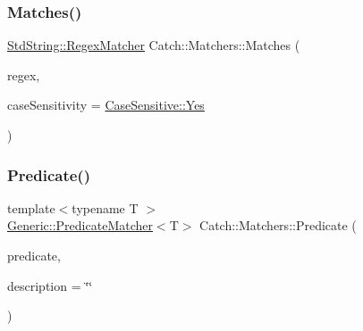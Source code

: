 \mbox{\label{namespace_catch_1_1_matchers_a82f1893cf50ae4c14b9b3e0980bf22b8}} 
\subsubsection{\texorpdfstring{Matches()}{Matches()}}
{\footnotesize\ttfamily \mbox{\hyperlink{struct_catch_1_1_matchers_1_1_std_string_1_1_regex_matcher}{Std\+String\+::\+Regex\+Matcher}} Catch\+::\+Matchers\+::\+Matches (\begin{DoxyParamCaption}\item[{std\+::string const \&}]{regex,  }\item[{\mbox{\hyperlink{struct_catch_1_1_case_sensitive_aad49d3aee2d97066642fffa919685c6a}{Case\+Sensitive\+::\+Choice}}}]{case\+Sensitivity = {\ttfamily \mbox{\hyperlink{struct_catch_1_1_case_sensitive_aad49d3aee2d97066642fffa919685c6aa7c5550b69ec3c502e6f609b67f9613c6}{Case\+Sensitive\+::\+Yes}}} }\end{DoxyParamCaption})}

\mbox{\label{namespace_catch_1_1_matchers_a034f2de6c0aac6f4a662fdf2558aedce}} 
\subsubsection{\texorpdfstring{Predicate()}{Predicate()}}
{\footnotesize\ttfamily template$<$typename T $>$ \\
\mbox{\hyperlink{class_catch_1_1_matchers_1_1_generic_1_1_predicate_matcher}{Generic\+::\+Predicate\+Matcher}}$<$T$>$ Catch\+::\+Matchers\+::\+Predicate (\begin{DoxyParamCaption}\item[{std\+::function$<$ bool(T const \&)$>$ const \&}]{predicate,  }\item[{std\+::string const \&}]{description = {\ttfamily \char`\"{}\char`\"{}} }\end{DoxyParamCaption})}

\mbox{\label{namespace_catch_1_1_matchers_a97c9ee09a70378ca7e8c6f9f01b0d6d1}} 
